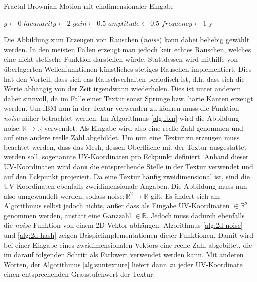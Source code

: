 \begin{algorithm}
  \caption{Fractal Brownian Motion mit eindimensionaler Eingabe}
  \label{alg:fbm}
  \SetAlgoLined


  \BlankLine
  $y \leftarrow 0$\;
  $\mathit{lacunarity}\leftarrow 2$\;
  $\mathit{gain}\leftarrow 0.5$\;
  \BlankLine
  $\mathit{amplitude}\leftarrow 0.5$\;
  $\mathit{frequency}\leftarrow 1$\;
  \BlankLine
  \BlankLine
  \Return y\;

\end{algorithm}

Die Abbildung zum Erzeugen von Rauschen (\textit{noise}) kann dabei beliebig
gewählt werden. In den meisten Fällen erzeugt man jedoch kein echtes Rauschen,
welches eine nicht stetische Funktion darstellen würde. Stattdessen wird
mithilfe von überlagerten Wellenfunktionen künstliches stetiges Rauschen
implementiert. Dies hat den Vorteil, dass sich das Rauschverhalten periodisch
ist, d.h. dass sich die Werte abhängig von der Zeit irgendwann wiederholen. Dies
ist unter anderem daher sinnvoll, da im Falle einer Textur sonst Sprünge bzw.
harte Kanten erzeugt werden. Um fBM nun in der Textur verwenden zu können muss
die Funktion \textit{noise} näher betrachtet werden. Im Algorithmus
\ref{alg:fbm} wird die Abbildung $\text{noise}: \mathbb{R} \to \mathbb{R}$
verwendet. Als Eingabe wird also eine reelle Zahl genommen und auf eine andere
reelle Zahl abgebildet. Um nun eine Textur zu erzeugen muss beachtet werden,
dass das Mesh, dessen Oberfläche mit der Textur ausgestattet werden soll,
sogenannte UV-Koordinaten pro Eckpunkt definiert. Anhand dieser UV-Koordinaten
wird dann die entsprechende Stelle in der Textur verwendet und auf den Eckpunkt
projeziert. Da eine Textur häufig zweidimensional ist, sind die UV-Koordinaten
ebenfalls zweidimensionale Angaben. Die Abbildung muss nun also umgewandelt
werden, sodass $\text{noise}: \mathbb{R}^2 \to \mathbb{R}$ gilt. Es ändert sich
am Algorithmus selbst jedoch nichts, außer dass als Eingabe UV-Koordinaten
$\in \mathbb{R}^2$ genommen werden, anstatt eine Ganzzahl $\in \mathbb{R}$.
Jedoch muss dadurch ebenfalls die \textit{noise}-Funktion von einem 2D-Vektor
abhängen. Algorithmus \ref{alg:2d-noise} und \ref{alg:2d-hash} zeigen
Beispielimplementationen dieser Funktionen. Damit wird bei einer
Eingabe eines zweidimensionalen Vektors eine reelle Zahl abgebiltet, die im
darauf folgenden Schritt als Farbwert verwendet werden kann. Mit anderen
Worten, der Algorithmus \ref{alg:suntexture} liefert dann zu jeder UV-Koordinate einen
entsprechenden Graustufenwert der Textur.

